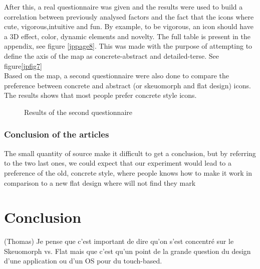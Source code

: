 \documentclass[a4paper,11pt] {article}
\theoremstyle{definition}
\begin{document}
After this, a real questionnaire was given and the results were used to build a correlation between previously analysed factors and the fact that the icons where cute, vigorous,intuitive and fun. By example, to be vigorous, an icon should have a 3D effect, color, dynamic elements and novelty. The full table is present in the appendix, see figure \ref{jppage8}. This was made with the purpose of attempting to define the axis of the map as concrete-abstract and detailed-terse. See figure\ref{jpfig7}
\\
Based on the map, a second questionnaire were also done to compare the preference between concrete and abstract (or skeuomorph and flat design) icons. The results shows that most people prefer concrete style icons.
\begin{figure}[H]
  \caption{Results of the second questionnaire}\label{jppage10}
\end{figure}
    \subsubsection{Conclusion of the articles}
        The small quantity of source make it difficult to get a conclusion, but by referring to the two last ones, we could expect that our experiment would lead to a preference of the old, concrete style, where people knows how to make it work in comparison to a new flat design where will not find they mark
\section{Conclusion}

(Thomas) Je pense que c'est important de dire qu'on s'est concentré sur le Skeuomorph vs. Flat mais que c'est qu'un point de la grande question du design d'une application ou d'un OS pour du touch-based.
\end{document}
